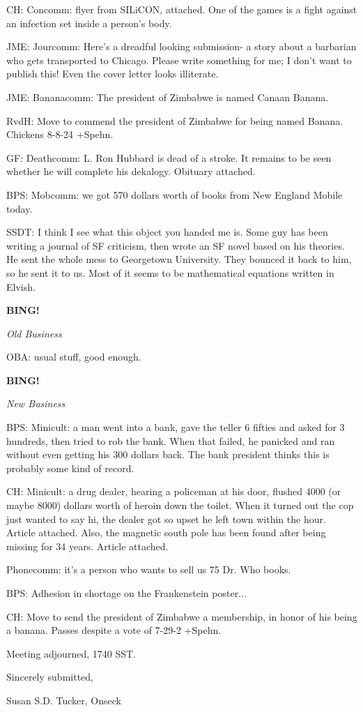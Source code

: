 \documentclass[12pt]{article}
\newcommand{\bing}{{\bf BING!} }
\newcommand{\goto}[1]{\bing \vskip 12pt \centerline{{\em{#1}}}}
\begin{document}
CH: Concomm: flyer from SILiCON, attached. One of the games is a fight against an infection set inside a person's body.

JME: Jourcomm: Here's a dreadful looking submission- a story about a barbarian who gets transported to Chicago. Please write something for me; I don't want to publish this! Even the cover letter looks illiterate.

JME: Bananacomm: The president of Zimbabwe is named Canaan Banana.

RvdH: Move to commend the president of Zimbabwe for being named Banana. Chickens 8-8-24 +Spehn.

GF: Deathcomm: L. Ron Hubbard is dead of a stroke. It remains to be seen whether he will complete his dekalogy. Obituary attached.

BPS: Mobcomm: we got 570 dollars worth of books from New England Mobile today.

SSDT: I think I see what this object you handed me is. Some guy has been writing a journal of SF criticism, then wrote an SF novel based on his theories. He sent the whole mess to Georgetown University. They bounced it back to him, so he sent it to us. Most of it seems to be mathematical equations written in Elvish.

\goto{Old Business}

OBA: usual stuff, good enough.

\goto{New Business}

BPS: Minicult: a man went into a bank, gave the teller 6 fifties and asked for 3 hundreds, then tried to rob the bank. When that failed, he panicked and ran without even getting his 300 dollars back. The bank president thinks this is probably some kind of record.

CH: Minicult: a drug dealer, hearing a policeman at his door, flushed 4000 (or maybe 8000) dollars worth of heroin down the toilet. When it turned out the cop just wanted to say hi, the dealer got so upset he left town within the hour. Article attached. Also, the magnetic south pole has been found after being missing for 34 years. Article attached.

Phonecomm: it's a person who wants to sell us 75 Dr. Who books.

BPS: Adhesion in shortage on the Frankenstein poster...

CH: Move to send the president of Zimbabwe a membership, in honor of his being a banana. Passes despite a vote of 7-29-2 +Spehn.

\vspace{12pt}

\noindent
Meeting adjourned, 1740 SST.

\vspace{18pt}

\centerline{Sincerely submitted,}
\centerline{Susan S.D. Tucker, Onseck}
\end{document}
